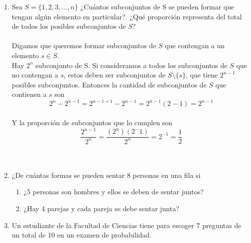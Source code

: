 \documentclass[12pt,a4paper]{report}
\begin{document}
\begin{enumerate}
{\begin{enumerate}
{   }
	\end{enumerate}

	}

   \item {
    Sea $S = \{1, 2, 3, ... , n\}$ ¿Cuántos subconjuntos de S se pueden
    formar que tengan algún elemento en particular?. ¿Qué proporción
    representa del total de todos los posibles subconjuntos de $S$?\\\\

		Digamos que queremos formar subconjuntos de $S$ que contengan a un elemento
		$s \in S$.\\
		Hay $2^n$ subconjunto de S. Si consideramos a todos los subconjuntos de $S$ que no
		contengan a $s$, estos deben ser subconjuntos de $S \setminus \{s\}$, que tiene $2^{n-1}$
		posibles subconjuntos. Entonces la cantidad de subconjuntos de $S$ que
		contienen a $s$ son\\
		\begin{equation*}
			2^n - 2^{n-1} = 2^{n - 1 + 1} - 2^{n-1} = 2^{n-1}(2 - 1) = 2^{n-1}
		\end{equation*}\\
		Y la proporción de subconjuntos que lo cumplen son\\
		\begin{equation*}
			\frac{2^{n-1}}{2^n}	= \frac{(2^n) (2^-1)}{2^n} = 2^{-1} = \frac{1}{2}
		\end{equation*}
		\\\\
	}

   \item {
    ¿De cuántas formas se pueden sentar 8 personas en una fila si\\

	\begin{enumerate}
   \item {
   ¿5 personas son hombres y ellos se deben de sentar juntos?\\

   }

   \item {
   ¿Hay 4 parejas y cada pareja se debe sentar junta?\\

   }

	\end{enumerate}

    }

   \item {
    Un estudiante de la Facultad de Ciencias tiene para escoger 7 preguntas
    de un total de 10 en un examen de probabilidad.\\

}
\end{enumerate}
\end{document}
